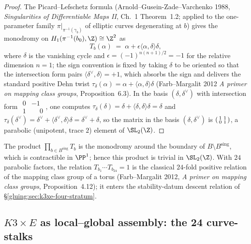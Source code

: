 \begin{proof}
The Picard--Lefschetz formula (Arnold--Gusein-Zade--Varchenko 1988,
\emph{Singularities of Differentiable Maps II}, Ch.~1 Theorem~1.2;
applied to the one-parameter family $\pi|_{\pi^{-1}(\gamma_b)}$ of
elliptic curves degenerating at $b$) gives the monodromy on
$H_1(\pi^{-1}(b_0), \Z) \cong \Z^2$ as
\[
 T_b(\alpha) \;=\; \alpha + \epsilon \langle \alpha, \delta \rangle
 \delta,
\]
where $\delta$ is the vanishing cycle and $\epsilon = (-1)^{n(n+1)/2} =
-1$ for the relative dimension $n = 1$; the sign convention is fixed
by taking $\delta$ to be oriented so that the intersection form pairs
$\langle \delta^\vee, \delta \rangle = +1$, which absorbs the sign
and delivers the standard positive Dehn twist $\tau_\delta(\alpha) =
\alpha + \langle \alpha, \delta\rangle \delta$ (Farb--Margalit 2012
\emph{A primer on mapping class groups}, Proposition~6.3).
In the basis $(\delta, \delta^{\vee})$ with intersection form
$\begin{smallmatrix} 0 & -1 \\ 1 & \phantom{-}0 \end{smallmatrix}$,
one computes
$\tau_\delta(\delta) = \delta + \langle \delta, \delta\rangle \delta
= \delta$
and
$\tau_\delta(\delta^{\vee}) = \delta^{\vee} + \langle \delta^{\vee},
\delta\rangle \delta = \delta^{\vee} + \delta$,
so the matrix in the basis $(\delta, \delta^{\vee})$ is
$\begin{psmallmatrix} 1 & 1 \\ 0 & 1 \end{psmallmatrix}$, a
parabolic (unipotent, trace $2$) element of $\SL_2(\Z)$.
\end{proof}

\begin{remark}
\label{gluing:rem:global-monodromy-trivial}
The product $\prod_{b \in B^{\mathrm{sing}}} T_b$ is the monodromy
around the boundary of $B \setminus B^{\mathrm{sing}}$, which is
contractible in $\PP^1$; hence this product is trivial in
$\SL_2(\Z)$. With $24$ parabolic factors, the relation
$T_{b_1} \cdots T_{b_{24}} = 1$ is the classical $24$-fold positive
relation of the mapping class group of a torus (Farb--Margalit 2012,
\emph{A primer on mapping class groups}, Proposition~4.12); it enters
the stability-datum descent relation of
\S\ref{gluing:sec:k3xe-four-stratum}.
\end{remark}

\subsection{$K3 \times E$ as local--global assembly: the 24 curve-stalks}
\label{gluing:sec:k3xe-local-global-assembly}

